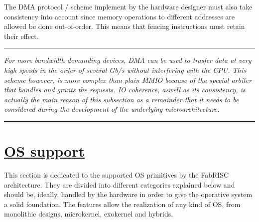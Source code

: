 \documentclass{article}
\begin{document}
            The DMA protocol / scheme implement by the hardware designer must also take consistency into account since memory operations to different addresses are allowed be done out-of-order. This means that fencing instructions must retain their effect.

        \par\noindent\rule{\textwidth}{0.4pt}
        \textit{For more bandwidth demanding devices, DMA can be used to trasfer data at very high speeds in the order of several Gb/s without interfering with the CPU. This scheme however, is more complex than plain MMIO because of the special arbiter that handles and grants the requests. IO coherence, aswell as its consistency, is actually the main reason of this subsection as a remainder that it needs to be considered during the development of the underlying microarchitecture.}
        \par\noindent\rule{\textwidth}{0.4pt}

    \clearpage


    \section[OS support]{\LARGE\underline{OS support}}

        This section is dedicated to the supported OS primitives by the FabRISC architecture. They are divided into different categories explained below and should be, ideally, handled by the hardware in order to give the operative system a solid foundation. The features allow the realization of any kind of OS, from monolithic designs, microkernel, exokernel and hybrids.
\end{document}
